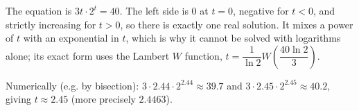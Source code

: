 The equation is $3t\cdot2^t=40$. The left side is $0$ at $t=0$, negative for $t<0$, and strictly increasing for $t>0$, so there is exactly one real solution. It mixes a power of $t$ with an exponential in $t$, which is why it cannot be solved with logarithms alone; its exact form uses the Lambert $W$ function, $t=\dfrac1{\ln2}W\!\left(\dfrac{40\ln2}3\right)$.

Numerically (e.g. by bisection): $3\cdot2.44\cdot2^{2.44}\approx39.7$ and $3\cdot2.45\cdot2^{2.45}\approx40.2$, giving $t\approx\boxed{2.45}$ (more precisely $2.4463$).
